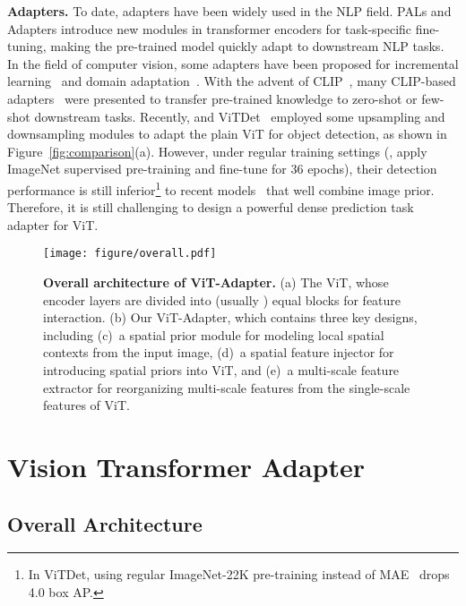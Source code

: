 \documentclass{article} \usepackage{iclr2023_conference,times}
\begin{document}
\noindent \textbf{Adapters.}
To date, adapters have been widely used in the NLP field. 
PALs \citep{stickland2019bert} and Adapters \citep{houlsby2019parameter} introduce new modules in transformer encoders for task-specific fine-tuning, making the pre-trained model quickly adapt to downstream NLP tasks.
In the field of computer vision, some adapters have been proposed for incremental learning~\citep{rosenfeld2018incremental} and domain adaptation~\citep{rebuffi2017learning,rebuffi2018efficient}.
With the advent of CLIP~\citep{radford2021learning}, many CLIP-based adapters~\citep{gao2021clip,sung2021vl,zhang2021tip} were presented to transfer pre-trained knowledge to zero-shot or few-shot downstream tasks.
Recently, \citet{li2021benchmarking} and ViTDet~\citep{li2022exploring} employed some upsampling and downsampling modules to adapt the plain ViT for object detection, as shown in Figure~\ref{fig:comparison}(a).
However, under regular training settings
(\ie, apply ImageNet supervised pre-training and fine-tune for 36 epochs), their detection performance is still inferior\footnote{In ViTDet, using regular ImageNet-22K pre-training instead of MAE~\citep{he2021masked} drops 4.0 box AP.} to recent models~\citep{chu2021conditional,dong2021cswin,wang2021pvtv2,wu2022p2t} that well combine image prior. 
Therefore, it is still challenging to design a powerful dense prediction task adapter for ViT.



\begin{figure}[tbp]
    \centering
    \texttt{[image: figure/overall.pdf]}
\caption{
        \textbf{Overall architecture of ViT-Adapter. }
        (a) The ViT, whose encoder layers are divided into  (usually ) equal blocks for feature interaction.
        (b) Our ViT-Adapter, which contains three key designs, including
        (c)~a spatial prior module for modeling local spatial contexts from the input image,
        (d)~a spatial feature injector for introducing spatial priors into ViT,
        and (e)~a multi-scale feature extractor for reorganizing multi-scale features from the single-scale features of ViT.
        }
    \label{fig:overall_architecture}
\end{figure}

\section{Vision Transformer Adapter}


\subsection{Overall Architecture}
\label{sec:overall_architecture}
\end{document}
